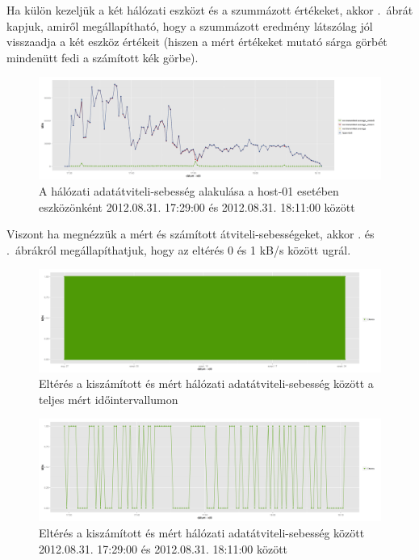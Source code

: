 \documentclass[a4paper,10pt,titlepage]{article}
\begin{document}
Ha külön kezeljük a két hálózati eszközt és a szummázott értékeket, akkor .~ábrát kapjuk, amiről megállapítható, hogy a szummázott eredmény látszólag jól visszaadja a két eszköz értékeit (hiszen a mért értékeket mutató sárga görbét mindenütt fedi a számított kék görbe).

\begin{figure}[ht!]
\centering
\includegraphics[width=1.00\textwidth]{figures/net_transmitted_average_dev-20120831172900-20120831181100.png}
\caption{ A hálózati adatátviteli-sebesség alakulása a host-01 esetében eszközönként 2012.08.31. 17:29:00 és 2012.08.31. 18:11:00 között \label{fig:net_transmitted_average_dev}}
\end{figure}

Viszont ha megnézzük a mért és számított átviteli-sebességeket, akkor . és .~ábrákról megállapíthatjuk, hogy az eltérés 0 és 1 kB/s között ugrál. 

\begin{figure}[ht!]
\centering
\includegraphics[width=1.00\textwidth]{figures/net_transmitted_average_diff-20120826230140-20120924083120.png}
\caption{ Eltérés a kiszámított és mért hálózati adatátviteli-sebesség között a teljes mért időintervallumon \label{fig:net_transmitted_average_diff-01}}
\end{figure}

\begin{figure}[ht!]
\centering
\includegraphics[width=1.00\textwidth]{figures/net_transmitted_average_diff-20120831172900-20120831181100.png}
\caption{ Eltérés a kiszámított és mért hálózati adatátviteli-sebesség között 2012.08.31. 17:29:00 és 2012.08.31. 18:11:00 között \label{fig:net_transmitted_average_diff-02}}
\end{figure}
\end{document}

